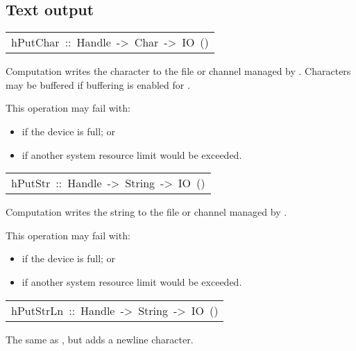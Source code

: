 \subsection{Text output
}
\begin{haddockdesc}
\item[\begin{tabular}{@{}l}
hPutChar\ ::\ Handle\ ->\ Char\ ->\ IO\ ()
\end{tabular}]\haddockbegindoc
Computation   writes the character  to the
 file or channel managed by .  Characters may be buffered if
 buffering is enabled for .
\par
This operation may fail with:
\par
\begin{itemize}
\item
  if the device is full; or
\par

\item
  if another system resource limit would be exceeded.
\par

\end{itemize}

\end{haddockdesc}
\begin{haddockdesc}
\item[\begin{tabular}{@{}l}
hPutStr\ ::\ Handle\ ->\ String\ ->\ IO\ ()
\end{tabular}]\haddockbegindoc
Computation   writes the string
  to the file or channel managed by .
\par
This operation may fail with:
\par
\begin{itemize}
\item
  if the device is full; or
\par

\item
  if another system resource limit would be exceeded.
\par

\end{itemize}

\end{haddockdesc}
\begin{haddockdesc}
\item[\begin{tabular}{@{}l}
hPutStrLn\ ::\ Handle\ ->\ String\ ->\ IO\ ()
\end{tabular}]\haddockbegindoc
The same as , but adds a newline character.
\par

\end{haddockdesc}
